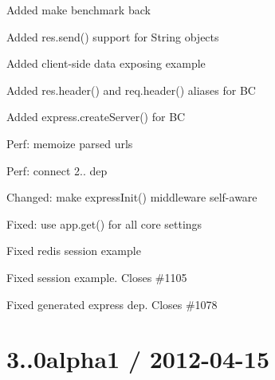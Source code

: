 {\ttfamily }

{\ttfamily 
\begin{DoxyItemize}
\item Added {\ttfamily make benchmark} back
\item Added {\ttfamily res.\+send()} support for {\ttfamily String} objects
\item Added client-\/side data exposing example
\item Added {\ttfamily res.\+header()} and {\ttfamily req.\+header()} aliases for BC
\item Added {\ttfamily express.\+create\+Server()} for BC
\item Perf\+: memoize parsed urls
\item Perf\+: connect 2.. dep
\item Changed\+: make {\ttfamily express\+Init()} middleware self-\/aware
\item Fixed\+: use app.\+get() for all core settings
\item Fixed redis session example
\item Fixed session example. Closes \#1105
\item Fixed generated express dep. Closes \#1078
\end{DoxyItemize}}

{\ttfamily \section*{3..\+0alpha1 / 2012-\/04-\/15 }}

{\ttfamily }

